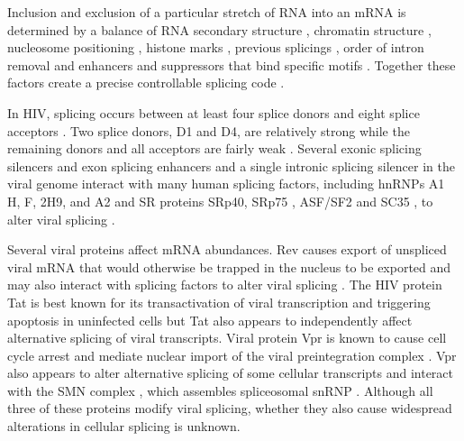 \documentclass[../sherrill-Mix_thesis.tex]{subfiles}
\begin{document}
	Inclusion and exclusion of a particular stretch of RNA into an mRNA is determined by a balance of RNA secondary structure \citep{Buratti2004,Jablonski2008,Shepard2008}, chromatin structure \citep{Allo2009}, nucleosome positioning \citep{Tilgner2009}, histone marks \citep{Schwartz2009}, previous splicings \citep{Crabb2010}, order of intron removal \citep{Takahara2002,Mata2010} and enhancers \citep{Zahler1993} and suppressors \citep{Smith2000} that bind specific motifs \citep{Ule2006}. Together these factors create a precise controllable splicing code \citep{Barash2010,Xiong2011,Witten2011}.  

	 In HIV, splicing occurs between at least four splice donors and eight splice acceptors \citep{Stoltzfus2009}. Two splice donors, D1 and D4, are relatively strong while the remaining donors and all acceptors are fairly weak \citep{O'Reilly1995}. Several exonic splicing silencers \citep{Amendt1994,Levengood2012} and exon splicing enhancers \citep{Caputi2004,Asang2008} and a single intronic splicing silencer \citep{Tange2001} in the viral genome interact with many human splicing factors, including hnRNPs A1 \citep{Tange2001, Levengood2012} H, F, 2H9, and A2 \citep{Jablonski2008} and SR proteins SRp40\citep{Caputi2004,Tranell2010}, SRp75 \citep{Tranell2010}, ASF/SF2 \citep{Caputi2004} and SC35 \citep{Jablonski2008}, to alter viral splicing \citep{Stoltzfus2006,Stoltzfus2009}.

	Several viral proteins affect mRNA abundances. Rev causes export of unspliced viral mRNA that would otherwise be trapped in the nucleus \citep{Legrain1989} to be exported \citep{Fischer1994,Pollard1998} and may also interact with splicing factors to alter viral splicing \citep{Tange1996}. The HIV protein Tat is best known for its transactivation of viral transcription \citep{Sodroski1985,Jones1994} and triggering apoptosis in uninfected cells \citep{McCloskey1997,Campbell2004} but Tat also appears to independently affect alternative splicing of viral transcripts\citep{Berro2006,Bohne2007,Jablonski2010,Miller2011}. Viral protein Vpr is known to cause cell cycle arrest \citep{Rogel1995} and mediate nuclear import of the viral preintegration complex \citep{Fouchier1998}. Vpr also appears to alter alternative splicing of some cellular transcripts \citep{Kuramitsu2005,Hashizume2007} and interact with the SMN complex \citep{Jager2012}, which assembles spliceosomal snRNP \citep{Gubitz2004}. Although all three of these proteins modify viral splicing, whether they also cause widespread alterations in cellular splicing is unknown.
\end{document}
